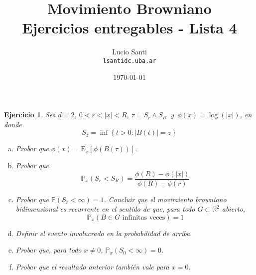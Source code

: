 \documentclass[a4paper,11pt]{article}
\title{Movimiento Browniano\\
      \small{Ejercicios entregables - Lista 4}}
\author{Lucio Santi\\
        \texttt{lsanti\at dc.uba.ar}}
\date{\today}
\newcommand{\abs}[1]{\ensuremath{\left\lvert #1 \right\rvert}}
\newcommand{\Prob}[1]{\ensuremath{\mathbb{P} \left( #1 \right)}}
\newcommand{\Probx}[2]{\ensuremath{\mathbb{P}_{#1} \left( #2 \right)}}
\newcommand{\Expx}[2]{\ensuremath{\textrm{E}_{#1}\left[#2\right]}}
\newtheorem*{ej}{Ejercicio}
\begin{document}
\maketitle

\begin{ej} 
Sea $d = 2$, $0 < r < \abs{x} < R$, $\tau = S_r \wedge S_R \,$ y $\, \phi(x) = \log(\abs{x})$,
en donde
$$S_z = \inf \left\{ t > 0 : \abs{B(t)} = z \right\}$$
\begin{enumerate}[a.]
    \item Probar que $\phi(x) = \Expx{x}{\phi(B(\tau))}$.

    \item Probar que
    $$\Probx{x}{S_r < S_R} = \frac{\phi(R) - \phi(\abs{x})}{\phi(R) - \phi(r)}$$

    \item Probar que $\Prob{S_r < \infty} = 1$. Concluir que el movimiento browniano
    bidimensional es recurrente en el sentido de que, para todo
    $G \subset \mathbb{R}^2$ abierto,
    $$\Probx{x}{B \in G \textrm{ infinitas veces}} = 1$$

    \item Definir el evento involucrado en la probabilidad de arriba.

    \item Probar que, para todo $x \neq 0$, $\Probx{x}{S_0 < \infty} = 0$.

    \item Probar que el resultado anterior también vale para $x = 0$.
\end{enumerate}
\end{ej}
\end{document}
